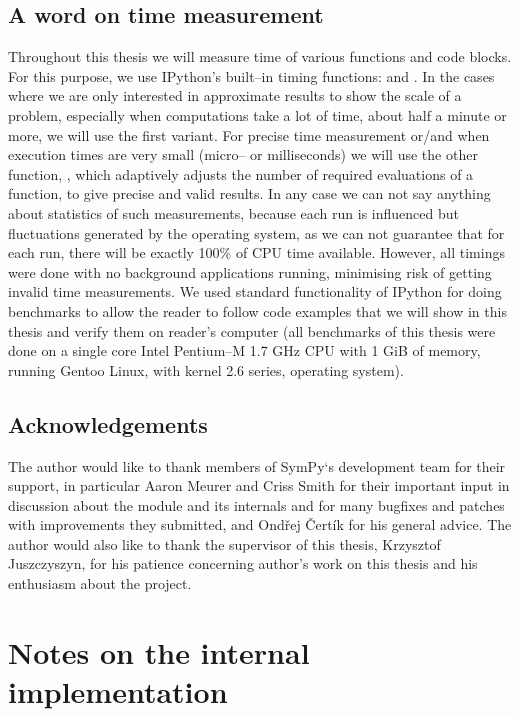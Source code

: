 \section{A word on time measurement}

Throughout this thesis we will measure time of various functions and code blocks. For this purpose,
we use IPython's built--in timing functions:  and . In the cases where we are
only interested in approximate results to show the scale of a problem, especially when computations
take a lot of time, about half a minute or more, we will use the first variant. For precise time
measurement or/and when execution times are very small (micro-- or milliseconds) we will use the
other function,  , which adaptively adjusts the number of required evaluations of a
function, to give precise and valid results. In any case we can not say anything about statistics
of such measurements, because each run is influenced but fluctuations generated by the operating
system, as we can not guarantee that for each run, there will be exactly 100\% of CPU time available.
However, all timings were done with no background applications running, minimising risk of getting
invalid time measurements. We used standard functionality of IPython for doing benchmarks to allow
the reader to follow code examples that we will show in this thesis and verify them on reader's
computer (all benchmarks of this thesis were done on a single core Intel Pentium--M 1.7 GHz CPU
with 1 GiB of memory, running Gentoo Linux, with kernel 2.6 series, operating system).


\section{Acknowledgements}

The author would like to thank members of SymPy`s development team for their support, in particular
Aaron Meurer and Criss Smith for their important input in discussion about the module and its internals
and for many bugfixes and patches with improvements they submitted, and Ondřej Čertík for his general
advice. The author would also like to thank the supervisor of this thesis, Krzysztof Juszczyszyn, for
his patience concerning author's work on this thesis and his enthusiasm about the project.



\chapter{Notes on the internal implementation}\label{thesis-internals}

